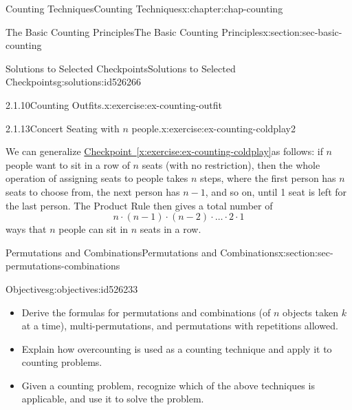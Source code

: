 \documentclass[oneside,10pt,]{book}
\newcommand{\xreffont}{\relax}
\numberwithin{equation}{section}
\begin{document}
\begin{chapterptx}{Counting Techniques}{}{Counting Techniques}{}{}{x:chapter:chap-counting}
\begin{sectionptx}{The Basic Counting Principles}{}{The Basic Counting Principles}{}{}{x:section:sec-basic-counting}
\begin{solutions-subsection-numberless}{Solutions to Selected Checkpoints}{}{Solutions to Selected Checkpoints}{}{}{g:solutions:id526266}
\begin{inlinesolution}{2.1.10}{Counting Outfits.}{x:exercise:ex-counting-outfit}
\begin{sidebyside}{1}{0.15}{0.15}{0}
\begin{sbspanel}{0.7}
{
}%
\end{sbspanel}%
\end{sidebyside}%
\end{inlinesolution}%
\begin{inlinesolution}{2.1.13}{Concert Seating with \(n\) people.}{x:exercise:ex-counting-coldplay2}%
\par\smallskip%
\noindent\hypertarget{g:solution:id526118-main}{}We can generalize \hyperref[x:exercise:ex-counting-coldplay]{Checkpoint~{\xreffont\ref{x:exercise:ex-counting-coldplay}}}as follows: if \(n\) people want to sit in a row of \(n\) seats (with no restriction), then the whole operation of assigning seats to people takes \(n\) steps, where the first person has \(n\) seats to choose from, the next person has \(n-1\), and so on, until 1 seat is left for the last person. The Product Rule then gives a total number of%
\begin{equation*}
n \cdot (n-1) \cdot (n-2) \cdot \ldots \cdot 2 \cdot 1
\end{equation*}
ways that \(n\) people can sit in \(n\) seats in a row.%
\end{inlinesolution}%
\end{solutions-subsection-numberless}
\end{sectionptx}
%
%
\typeout{************************************************}
\typeout{************************************************}
%
\begin{sectionptx}{Permutations and Combinations}{}{Permutations and Combinations}{}{}{x:section:sec-permutations-combinations}
\begin{objectives}{Objectives}{g:objectives:id526233}
%
\begin{itemize}[label=\textbullet]
\item{}Derive the formulas for permutations and combinations (of \(n\) objects taken \(k\) at a time), multi-permutations, and permutations with repetitions allowed.%
\item{}Explain how overcounting is used as a counting technique and apply it to counting problems.%
\item{}Given a counting problem, recognize which of the above techniques is applicable, and use it to solve the problem.%

\end{itemize}
\end{objectives}
\end{sectionptx}
\end{chapterptx}
\end{document}
